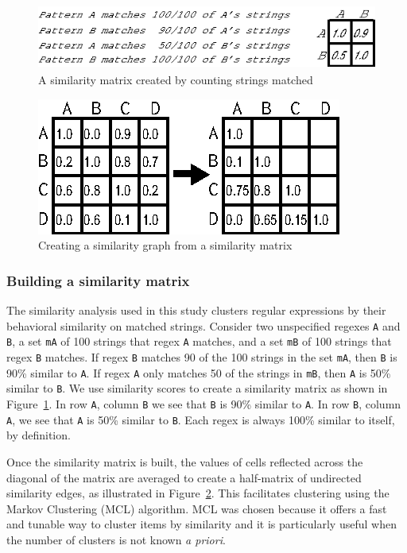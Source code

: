 \begin{figure}[tb]
\centering
\includegraphics[height=0.85in]{nontex/illustrations/minimalMatrix.eps}
\caption{A similarity matrix created by counting strings matched}
\label{fig:minimalMatrix}
\end{figure}

\begin{figure}[tb]
\centering
\includegraphics[width=0.5\columnwidth]{nontex/illustrations/matrixToGraph.eps}
\vspace{-6pt}
\caption{Creating a similarity graph from a similarity matrix}
\vspace{-6pt}
\label{fig:matrixToGraph}
\end{figure}



\subsubsection{Building a similarity matrix}
The similarity analysis used in this study clusters regular expressions by their behavioral similarity on matched strings.
Consider two unspecified regexes {\tt A} and {\tt B}, a set {\tt mA} of 100 strings that regex {\tt A} matches, and a set {\tt mB} of 100 strings that regex {\tt B} matches.
If regex {\tt B} matches 90 of the 100 strings in the set {\tt mA}, then {\tt B} is 90\% similar to {\tt A}.
If regex {\tt A} only matches 50 of the strings in {\tt mB}, then {\tt A} is 50\% similar to {\tt B}.
We use similarity scores to create a similarity matrix as shown in Figure~\ref{fig:minimalMatrix}.
In row {\tt A}, column {\tt B} we see that {\tt B} is 90\% similar to {\tt A}.
In row {\tt B}, column {\tt A}, we see that {\tt A} is 50\% similar to {\tt B}.  Each regex is always 100\% similar to itself, by definition.

Once the similarity matrix is built, the values of cells reflected across the diagonal of the matrix are averaged to create a half-matrix of undirected similarity edges, as illustrated in Figure~\ref{fig:matrixToGraph}.
This facilitates clustering using the  Markov Clustering (MCL) algorithm.
MCL was chosen because it offers a fast and tunable way to cluster items by similarity and it is particularly useful when the number of clusters is not known \emph{a priori}.


